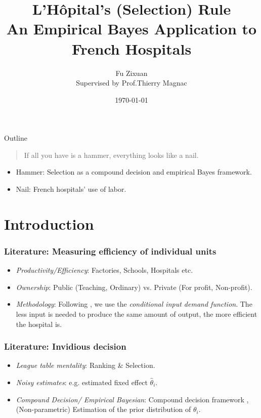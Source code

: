 \documentclass[10pt,mathserif,]{beamer}
\title{\large \bfseries L'Hôpital's (Selection) Rule\\
  An Empirical Bayes Application to French Hospitals}
\author{Fu Zixuan\\[3ex]
  Supervised by Prof.Thierry Magnac}
\date{\today}
\begin{document}
\frame{
  \thispagestyle{empty}
  \titlepage
}
\begin{frame}{Outline}
  \begin{quote}
    If all you have is a hammer, everything looks like a nail.
  \end{quote}
  \begin{itemize}
    \item Hammer: Selection as a compound decision and empirical Bayes framework.
          \citep{robbins1956empirical,gu2023invidious}
    \item Nail: French hospitals' use of labor. \citep{croiset2024hospitals}
  \end{itemize}
\end{frame}
\section{Introduction}

\begin{frame}[label=literature]
  \frametitle{Literature: Measuring efficiency of individual units}
  \begin{itemize}\itemsep=12pt

    \item \textit{Productivity/Efficiency}: Factories, Schools, Hospitals etc.
    \item \textit{Ownership}: Public (Teaching, Ordinary) vs. Private (For profit, Non-profit).
    \item \textit{Methodology}: Following \citet{croiset2024hospitals}, we use the \textit{conditional input demand function}.
          The less input is needed to produce the same amount
          of output, the more efficient the hospital is.\hyperlink{inputdemand}{}
  \end{itemize}
\end{frame}

\begin{frame}
  \frametitle{Literature: Invidious decision}
  \begin{itemize}\itemsep=12pt
    \item \textit{League table mentality}: Ranking \& Selection.\citep{gu2023invidious}
    \item \textit{Noisy estimates}: e.g. estimated fixed effect $\hat{\theta}_i$. \citep{chetty2014measuring,kline2022systemic}
    \item \textit{Compound Decision/ Empirical Bayesian}: Compound decision framework \citep{robbins1956empirical}, (Non-parametric) Estimation of the prior distribution of $\theta_i$. \citep{koenker2014convex, gu2017empirical}
  \end{itemize}
\end{frame}
\end{document}
